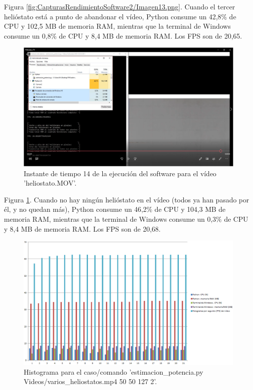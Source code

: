 Figura \ref{fig:CapturasRendimientoSoftware2/Imagen13.png}. Cuando el tercer helióstato está a punto de abandonar el vídeo, Python consume un 42,8\% de CPU y 102,5 MB de memoria RAM, mientras que la terminal de Windows consume un 0,8\% de CPU y 8,4 MB de memoria RAM. Los FPS son de 20,65.\\[20pt]

\begin{figure}[h!]
  	\centering
	\includegraphics[width=\textwidth]{CapturasRendimientoSoftware2/Imagen14.png}
	\caption{Instante de tiempo 14 de la ejecución del software para el vídeo 'heliostato.MOV'.
	\label{fig:CapturasRendimientoSoftware2/Imagen14.png}}
\end{figure}

Figura \ref{fig:CapturasRendimientoSoftware2/Imagen14.png}. Cuando no hay ningún helióstato en el vídeo (todos ya han pasado por él, y no quedan más), Python consume un 46,2\% de CPU y 104,3 MB de memoria RAM, mientras que la terminal de Windows consume un 0,3\% de CPU y 8,4 MB de memoria RAM. Los FPS son de 20,68.\\[20pt]

\begin{figure}[h!]
  	\centering
	\includegraphics[width=\textwidth]{CapturasRendimientoSoftware1/GraficasRendimientoSoftware1.PNG}
	\caption{Histograma para el caso/comando 'estimacion\_potencia.py Videos/varios\_heliostatos.mp4 50 50 127 2'.
	\label{fig:CapturasRendimientoSoftware1/GraficasRendimientoSoftware1.PNG}}
\end{figure}

